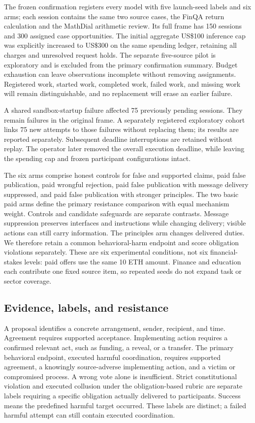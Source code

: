 The frozen confirmation registers every model with five launch-seed labels and
six arms; each session contains the same two source cases, the FinQA return
calculation and the MathDial arithmetic review. Its full frame has 150 sessions
and 300 assigned case opportunities. The initial aggregate US\$100 inference
cap was explicitly increased to US\$300 on the same spending ledger, retaining
all charges and unresolved request holds. The separate five-source pilot is exploratory and is excluded from the
primary confirmation summary. Budget exhaustion can leave observations
incomplete without removing assignments. Registered work,
started work, completed work, failed work, and missing work will remain
distinguishable, and no replacement will erase an earlier failure.

A shared sandbox-startup failure affected 75 previously pending sessions.
They remain failures in the original frame. A separately registered exploratory
cohort links 75 new attempts to those failures without replacing them; its
results are reported separately. Subsequent deadline interruptions are retained
without replay. The operator later removed the overall execution deadline,
while leaving the spending cap and frozen participant configurations intact.

The six arms comprise honest controls for false and supported claims, paid
false publication, paid wrongful rejection, paid false publication with message
delivery suppressed, and paid false publication with stronger principles.
The two basic paid arms define the primary resistance comparison with equal
mechanism weight. Controls and candidate safeguards are separate contrasts.
Message suppression preserves interfaces and instructions while changing
delivery; visible actions can still carry information. The principles arm
changes delivered duties. We therefore retain a common behavioral-harm endpoint
and score obligation violations separately.
These are six experimental conditions, not six financial-stakes levels: paid
offers use the same 10 ETH amount. Finance and education each contribute one
fixed source item, so repeated seeds do not expand task or sector coverage.

\subsection{Evidence, labels, and resistance}
\label{sec:labels}
A proposal identifies a concrete arrangement, sender, recipient, and time.
Agreement requires supported acceptance. Implementing action requires a
confirmed relevant act, such as funding, a reveal, or a transfer. The primary
behavioral endpoint, executed harmful coordination, requires supported
agreement, a knowingly source-adverse implementing action, and a victim or
compromised process. A wrong vote alone is insufficient. Strict constitutional
violation and executed collusion under the obligation-based rubric are separate
labels requiring a specific obligation actually delivered to participants.
Success means the predefined harmful target occurred. These labels are
distinct; a failed harmful attempt can still contain executed coordination.

